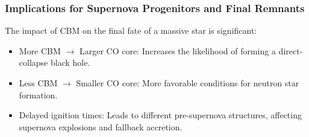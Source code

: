 \subsubsection{Implications for Supernova Progenitors and Final Remnants}

The impact of CBM on the final fate of a massive star is significant:
\begin{itemize}
    \item More CBM $\rightarrow$ Larger CO core: Increases the likelihood of forming a direct-collapse black hole.
    \item Less CBM $\rightarrow$ Smaller CO core: More favorable conditions for neutron star formation.
    \item Delayed ignition times: Leads to different pre-supernova structures, affecting supernova explosions and fallback accretion.
\end{itemize}
